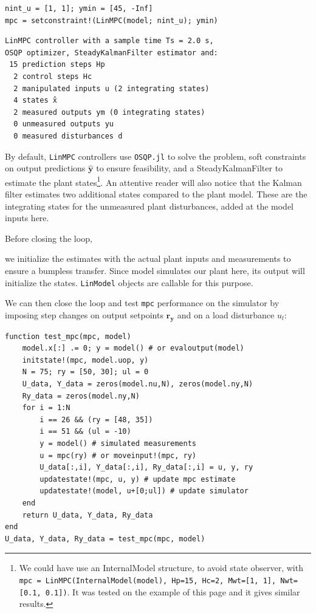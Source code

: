\begin{verbatim}
nint_u = [1, 1]; ymin = [45, -Inf]
mpc = setconstraint!(LinMPC(model; nint_u); ymin)
\end{verbatim}
\vspace{-25pt}
\begin{verbatim}
LinMPC controller with a sample time Ts = 2.0 s,
OSQP optimizer, SteadyKalmanFilter estimator and:
 15 prediction steps Hp
  2 control steps Hc
  2 manipulated inputs u (2 integrating states)
  4 states x̂
  2 measured outputs ym (0 integrating states)
  0 unmeasured outputs yu
  0 measured disturbances d
\end{verbatim}

By default, \texttt{LinMPC} controllers use \texttt{OSQP.jl} to solve the problem, soft constraints on output predictions $\mathbf{\hat y}$ to ensure feasibility, and a SteadyKalmanFilter to estimate the plant states\footnote{We could have use an InternalModel structure, to avoid state observer, with \texttt{mpc = LinMPC(InternalModel(model), Hp=15, Hc=2, Mwt=[1, 1], Nwt=[0.1, 0.1])}. It was tested on the example of this page and it gives similar results.}. An attentive reader will also notice that the Kalman filter estimates two additional states compared to the plant model. These are the integrating states for the unmeasured plant disturbances, added at the model inputs here.  

Before closing the loop, 

we initialize the estimates with the actual plant inputs and measurements to ensure a bumpless transfer. Since model simulates our plant here, its output will initialize the states. \texttt{LinModel} objects are callable for this purpose. 

We can then close the loop and test \texttt{mpc} performance on the simulator by imposing step changes on output setpoints $\mathbf{r_y}$ and on a load disturbance $u_l$:

\begin{verbatim}
function test_mpc(mpc, model)
    model.x[:] .= 0; y = model() # or evaloutput(model)
    initstate!(mpc, model.uop, y)
    N = 75; ry = [50, 30]; ul = 0
    U_data, Y_data = zeros(model.nu,N), zeros(model.ny,N)
    Ry_data = zeros(model.ny,N)
    for i = 1:N
        i == 26 && (ry = [48, 35])
        i == 51 && (ul = -10)
        y = model() # simulated measurements
        u = mpc(ry) # or moveinput!(mpc, ry)
        U_data[:,i], Y_data[:,i], Ry_data[:,i] = u, y, ry
        updatestate!(mpc, u, y) # update mpc estimate
        updatestate!(model, u+[0;ul]) # update simulator
    end
    return U_data, Y_data, Ry_data
end
U_data, Y_data, Ry_data = test_mpc(mpc, model)
\end{verbatim}

